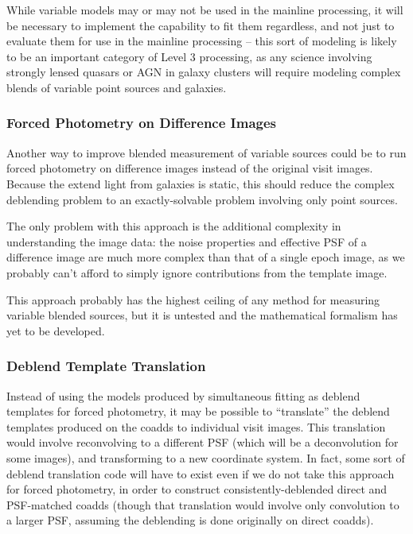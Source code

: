 \documentclass[10pt]{article}
\begin{document}
While variable models may or may not be used in the mainline processing, it
will be necessary to implement the capability to fit them regardless, and not
just to evaluate them for use in the mainline processing -- this sort of
modeling is likely to be an important category of Level 3 processing, as any
science involving strongly lensed quasars or AGN in galaxy clusters will
require modeling complex blends of variable point sources and galaxies.

\subsubsection{Forced Photometry on Difference Images}

\label{sec:diffim-forced-phot}

Another way to improve blended measurement of variable sources could be to run
forced photometry on difference images instead of the original visit images.
Because the extend light from galaxies is static, this should reduce the
complex deblending problem to an exactly-solvable problem involving only
point sources.

The only problem with this approach is the additional complexity in
understanding the image data: the noise properties and effective PSF of a
difference image are much more complex than that of a single epoch image, as
we probably can't afford to simply ignore contributions from the template
image.

This approach probably has the highest ceiling of any method for measuring
variable blended sources, but it is untested and the mathematical formalism
has yet to be developed.

\subsubsection{Deblend Template Translation}

\label{sec:deblender-translation}

Instead of using the models produced by simultaneous fitting as deblend
templates for forced photometry, it may be possible to ``translate'' the
deblend templates produced on the coadds to individual visit images.  This
translation would involve reconvolving to a different PSF (which will be a
deconvolution for some images), and transforming to a new coordinate system.
In fact, some sort of deblend translation code will have to exist even if we
do not take this approach for forced photometry, in order to construct
consistently-deblended direct and PSF-matched coadds (though that translation
would involve only convolution to a larger PSF, assuming the deblending is
done originally on direct coadds).
\end{document}
